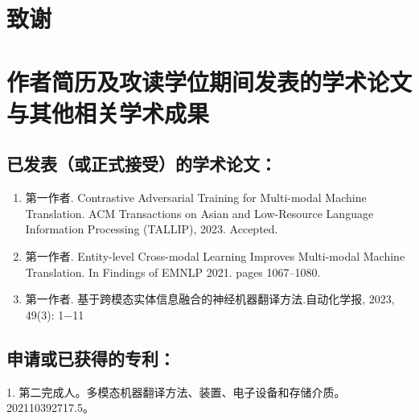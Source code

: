 \chapter[致谢]{致\quad 谢}%



\chapter{作者简历及攻读学位期间发表的学术论文与其他相关学术成果}





\section*{已发表（或正式接受）的学术论文：}

{
\setlist[enumerate]{}%
\begin{enumerate}[nosep]
    \item 第一作者. Contrastive Adversarial Training for Multi-modal Machine Translation. ACM Transactions on Asian and Low-Resource Language Information Processing (TALLIP), 2023. Accepted.
    \item 第一作者. Entity-level Cross-modal Learning Improves Multi-modal Machine Translation. In Findings of EMNLP 2021. pages 1067–1080.
    \item 第一作者. 基于跨模态实体信息融合的神经机器翻译方法.自动化学报, 2023, 49(3): 1−11
\end{enumerate}
}

\section*{申请或已获得的专利：}

1. 第二完成人。多模态机器翻译方法、装置、电子设备和存储介质。202110392717.5。



\cleardoublepage[plain]%

